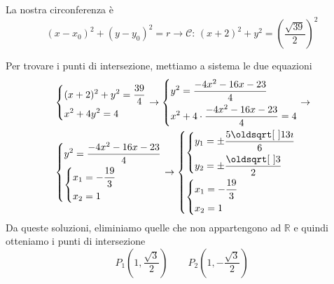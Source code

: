 \begin{center}
\end{center}

La nostra circonferenza è
\begin{equation*}
  (x-x_0)^2+(y-y_0)^2=r \rightarrow \mathscr{C}:\,(x+2)^2 + y^2 = \left(\frac{\sqrt{39}}{2}\right)^2
\end{equation*}

Per trovare i punti di intersezione, mettiamo a sistema le due equazioni
\begin{align*}
  &\begin{dcases}
  (x+2)^2+y^2=\frac{39}{4}\\
  x^2+4y^2=4
\end{dcases}\rightarrow
\begin{dcases}
  y^2 = \frac{-4x^2-16x-23}{4}\\
  x^2+4\cdot\frac{-4x^2-16x-23}{4}=4
\end{dcases}\rightarrow\\
&\begin{dcases}
y^2 = \frac{-4x^2-16x-23}{4}\\
\begin{dcases}
  x_1 = -\frac{19}{3}\\
  x_2 = 1
\end{dcases}
\end{dcases}\rightarrow
\begin{dcases}
  \begin{dcases}
    y_1 = \pm\frac{5\sqrt{13}\imath}{6}\\
    y_2 = \pm\frac{\sqrt{3}}{2}
  \end{dcases}\\
  \begin{dcases}
    x_1 = -\frac{19}{3}\\
    x_2 = 1
  \end{dcases}
\end{dcases}
\end{align*}
Da queste soluzioni, eliminiamo quelle che non appartengono ad $\mathbb{R}$ e quindi otteniamo
i punti di intersezione
\begin{equation*}
  \boxed{P_1\left(1,\frac{\sqrt{3}}{2}\right)\qquad P_2\left(1,-\frac{\sqrt{3}}{2}\right)}
\end{equation*}

